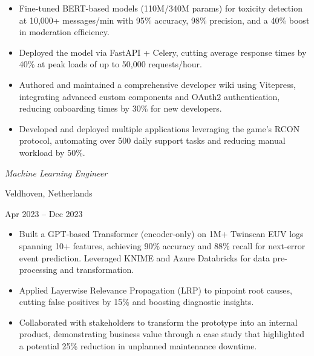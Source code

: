 \documentclass[10pt, letterpaper]{article}
\newenvironment{highlights}{
    \begin{itemize}[
        topsep=0.10 cm,
        parsep=0.10 cm,
        partopsep=0pt,
        itemsep=0pt,
        leftmargin=0.4 cm + 10pt
    ]
}{
    \end{itemize}
} %
\newenvironment{twocolentry}[2][]{
    \onecolentry
    \def\secondColumn{#2}
    \setcolumnwidth{\fill, 4.5 cm}
    \begin{paracol}{2}
}{
    \switchcolumn \raggedleft \secondColumn
    \end{paracol}
    \endonecolentry
} %
\let\hrefWithoutArrow\href
\renewcommand{\href}[2]{\hrefWithoutArrow{#1}{\ifthenelse{\equal{#2}{}}{ }{#2 }\raisebox{.15ex}{\footnotesize \faExternalLink*}}}
\begin{document}
        \begin{highlights}
            \item Fine-tuned BERT-based models (110M/340M params) for toxicity detection at 10,000+ messages/min with 95\% accuracy, 98\% precision, and a 40\% boost in moderation efficiency.
            \item Deployed the model via FastAPI + Celery, cutting average response times by 40\% at peak loads of up to 50,000 requests/hour.
            \item Authored and maintained a comprehensive developer wiki using Vitepress, integrating advanced custom components and OAuth2 authentication, reducing onboarding times by 30\% for new developers.
            \item Developed and deployed multiple applications leveraging the game's RCON protocol, automating over 500 daily support tasks and reducing manual workload by 50\%.
        \end{highlights}

        \vspace{0.3 cm}

        \begin{twocolentry}{
            Veldhoven, Netherlands

        Apr 2023 – Dec 2023
        }
            \textbf{\href{https://www.asml.com/en}{ASML}}
            
            \textit{Machine Learning Engineer}
        \end{twocolentry}
        \vspace{0.1 cm}
        
        \begin{highlights}
            \item Built a GPT-based Transformer (encoder-only) on 1M+ Twinscan EUV logs spanning 10+ features, achieving 90\% accuracy and 88\% recall for next-error event prediction. Leveraged KNIME and Azure Databricks for data pre-processing and transformation.
            \item Applied Layerwise Relevance Propagation (LRP) to pinpoint root causes, cutting false positives by 15\% and boosting diagnostic insights.
            \item Collaborated with stakeholders to transform the prototype into an internal product, demonstrating business value through a case study that highlighted a potential 25\% reduction in unplanned maintenance downtime.
        \end{highlights}
\end{document}
